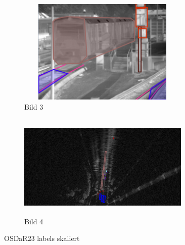 \begin{figure}[H]
    \begin{subfigure}{0.45\textwidth}
        \centering
        \includegraphics[width=0.9\textwidth,height=5cm]{PICs/OSDaR23_dataset/labeled_IR.png}
        \caption{Bild 3}
    \end{subfigure}%
    \hspace{0.05\textwidth}
    \begin{subfigure}{0.45\textwidth}
        \centering
        \includegraphics[width=0.9\textwidth,height=5cm]{PICs/OSDaR23_dataset/labeled_Radar.png}
        \caption{Bild 4}
    \end{subfigure}
    
    \caption{OSDaR23 labels skaliert}
\end{figure}

